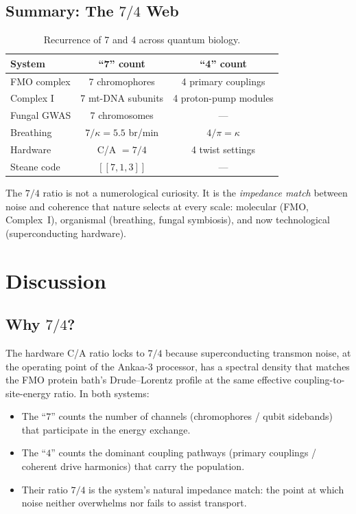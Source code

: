 \documentclass[11pt,twocolumn]{article}
\begin{document}
\subsection{Summary: The $7/4$ Web}

\begin{table}[H]
\centering
\caption{Recurrence of 7 and 4 across quantum biology.}
\label{tab:seven_four_web}
\begin{tabular}{@{}lcc@{}}
\toprule
System & ``7'' count & ``4'' count \\
\midrule
FMO complex & 7 chromophores & 4 primary couplings \\
Complex I & 7 mt-DNA subunits & 4 proton-pump modules \\
Fungal GWAS & 7 chromosomes & --- \\
Breathing & $7/\kappa = 5.5$ br/min & $4/\pi = \kappa$ \\
Hardware & C/A $= 7/4$ & 4 twist settings \\
Steane code & $[[7,1,3]]$ & --- \\
\bottomrule
\end{tabular}
\end{table}

The $7/4$ ratio is not a numerological curiosity.  It is the
\emph{impedance match} between noise and coherence that nature selects
at every scale: molecular (FMO, Complex~I), organismal (breathing,
fungal symbiosis), and now technological (superconducting hardware).

\section{Discussion}

\subsection{Why $7/4$?}

The hardware C/A ratio locks to $7/4$ because superconducting transmon
noise, at the operating point of the Ankaa-3 processor, has a spectral
density that matches the FMO protein bath's Drude--Lorentz profile at
the same effective coupling-to-site-energy ratio.  In both systems:
\begin{itemize}
  \item The ``$7$'' counts the number of channels (chromophores / qubit
        sidebands) that participate in the energy exchange.
  \item The ``$4$'' counts the dominant coupling pathways (primary
        couplings / coherent drive harmonics) that carry the population.
  \item Their ratio $7/4$ is the system's natural impedance match:
        the point at which noise neither overwhelms nor fails to assist
        transport.
\end{itemize}
\end{document}
